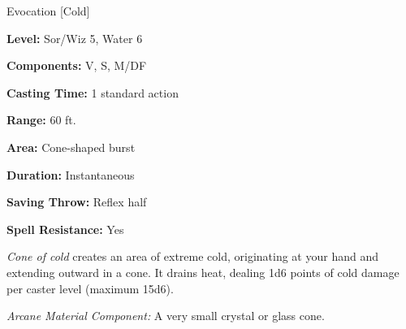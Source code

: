 
Evocation [Cold]

\textbf{Level:} Sor/Wiz 5, Water 6

\textbf{Components:} V, S, M/DF

\textbf{Casting Time:} 1 standard action

\textbf{Range:} 60 ft.

\textbf{Area:} Cone-shaped burst

\textbf{Duration:} Instantaneous

\textbf{Saving Throw:} Reflex half

\textbf{Spell Resistance:} Yes

\textit{Cone of cold} creates an area of extreme cold, originating at your hand 
and extending outward in a cone. It drains heat, dealing 1d6 points of cold damage 
per caster level (maximum 15d6).

\textit{Arcane Material Component:} A very small crystal or glass cone.

